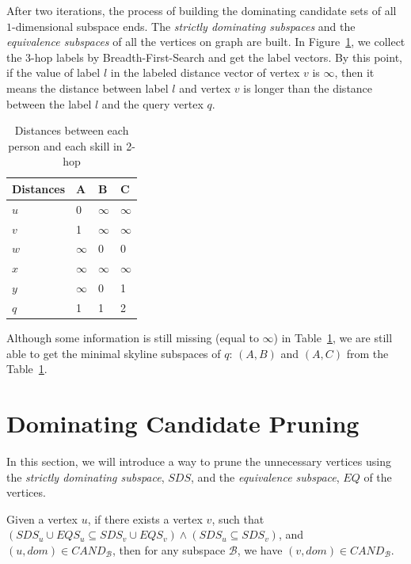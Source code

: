 After two iterations, the process of building the dominating candidate sets of all $1$-dimensional subspace ends. The \emph{strictly dominating subspaces} and the \emph{equivalence subspaces} of all the vertices on graph are built. In Figure~\ref{tab:d_hops_distance}, we collect the $3$-hop labels by Breadth-First-Search and get the label vectors. By this point, if the value of label $l$ in the labeled distance vector of vertex $v$ is $\infty$, then it means the distance between label $l$ and vertex $v$ is longer than the distance between the label $l$ and the query vertex $q$.

\begin{table}[h]
    \centering
    \begin{tabular}{llll}
    \hline
    Distances & A & B & C \\ \hline
    $u$       & 0 & $\infty$ & $\infty$ \\ \hline
    $v$       & 1 & $\infty$ & $\infty$ \\ \hline
    $w$       & $\infty$ & 0 & 0 \\ \hline
    $x$       & $\infty$ & $\infty$ & $\infty$ \\ \hline
    $y$       & $\infty$ & 0 & 1 \\ \hline
    $q$       & 1 & 1 & 2 \\ \hline
    \end{tabular}
    \caption{Distances between each person and each skill in 2-hop}
    \label{tab:d_hops_distance}
\end{table}

Although some information is still missing (equal to $\infty$) in Table~\ref{tab:d_hops_distance}, we are still able to get the minimal skyline subspaces of $q$: $(A, B)$ and $(A, C)$ from the Table~\ref{tab:d_hops_distance}.

\section{Dominating Candidate Pruning}

In this section, we will introduce a way to prune the unnecessary vertices using the \emph{strictly dominating subspace}, $\mathit{SDS}$, and the \emph{equivalence subspace}, $\mathit{EQ}$ of the vertices.


\begin{lemma}
\label{ppt:prune_cand}
Given a vertex $u$, if there exists a vertex $v$, such that $(SDS_u \cup EQS_u \subseteq SDS_v \cup EQS_v) \wedge (SDS_u \subseteq SDS_v)$, and $(u, dom) \in \mathit{CAND}_\mathcal{B}$, then for any subspace $\mathcal{B}$, we have $(v, dom) \in \mathit{CAND}_\mathcal{B}$.
\end{lemma}


